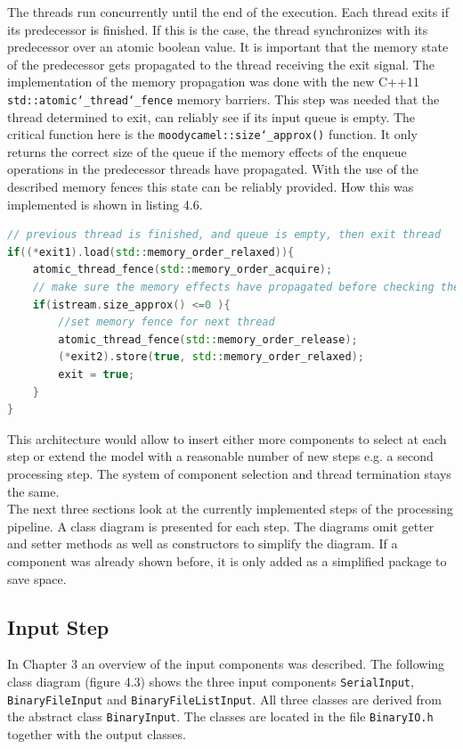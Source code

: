 The threads run concurrently until the end of the execution. Each thread exits if its predecessor is finished. If this is the case, the thread synchronizes with its predecessor over an atomic boolean value. It is important that the memory state of the predecessor gets propagated to the thread receiving the exit signal. The implementation of the memory propagation was done with the new C++11 \texttt{std::atomic\char`_thread\char`_fence} memory barriers. This step was needed that the thread determined to exit, can reliably see if its input queue is empty. The critical function here is the \texttt{moodycamel::size\char`_approx()} function. It only returns the correct size of the queue if the memory effects of the enqueue operations in the predecessor threads have propagated. With the use of the described memory fences this state can be reliably provided. How this was implemented is shown in listing 4.6.
\begin{lstlisting}[language=C++, caption=Code snippet highlighting the memory barriers.]
// previous thread is finished, and queue is empty, then exit thread
if((*exit1).load(std::memory_order_relaxed)){
    atomic_thread_fence(std::memory_order_acquire);
    // make sure the memory effects have propagated before checking the size
    if(istream.size_approx() <=0 ){
        //set memory fence for next thread
        atomic_thread_fence(std::memory_order_release);
        (*exit2).store(true, std::memory_order_relaxed);
        exit = true;
    }
}
\end{lstlisting}

This architecture would allow to insert either more components to select at each step or extend the model with a reasonable number of new steps e.g. a second processing step. The system of component selection and thread termination stays the same.\\
The next three sections look at the currently implemented steps of the processing pipeline. A class diagram is presented for each step. The diagrams omit getter and setter methods as well as constructors to simplify the diagram. If a component was already shown before, it is only added as a simplified package to save space.
\subsection{Input Step}
In Chapter 3 an overview of the input components was described. The following class diagram (figure 4.3) shows the three input components \texttt{SerialInput}, \texttt{BinaryFileInput} and \texttt{BinaryFileListInput}. All three classes are derived from the abstract class \texttt{BinaryInput}. The classes are located in the file \texttt{BinaryIO.h} together with the output classes.

